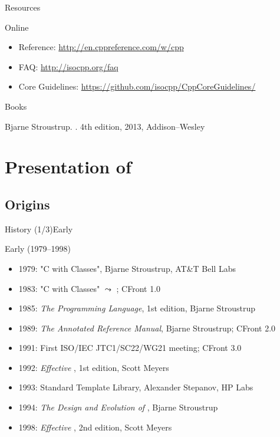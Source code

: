 \begin{frame}{Resources}{}
  \begin{block}{Online}
    \begin{itemize}
    \item
      \CCLang Reference: \url{http://en.cppreference.com/w/cpp}
    \item
      \CCLang FAQ: \url{http://isocpp.org/faq}
    \item
      \CCLang Core Guidelines: \url{https://github.com/isocpp/CppCoreGuidelines/}
    \end{itemize}
  \end{block}

  \begin{block}{Books}
    \begin{thebibliography}{}
      Bjarne Stroustrup.
      .
      \newblock 4th edition, 2013, Addison--Wesley
    \end{thebibliography}
  \end{block}
\end{frame}

\section{Presentation of \CCLang}

\subsection{\CCLang Origins}


\begin{frame}{\CCLang History (1/3)}{Early \CCLang}
  \begin{block}{Early \CCLang (1979--1998)}
    \begin{itemize}
    \item
      1979: "C with Classes", Bjarne Stroustrup, AT\&T Bell Labs
    \item
      1983: "C with Classes" $\leadsto$ \CCLang; CFront 1.0
    \item
      1985: \emph{The \CCLang Programming Language}, 1st edition, Bjarne Stroustrup
    \item
      1989: \emph{The Annotated \CCLang Reference Manual}, Bjarne Stroustrup; CFront 2.0
    \item
      1991: First ISO/IEC JTC1/SC22/WG21 meeting; CFront 3.0
    \item
      1992: \emph{Effective \CCLang}, 1st edition, Scott Meyers
    \item
      1993: Standard Template Library, Alexander Stepanov, HP Labs
    \item
      1994: \emph{The Design and Evolution of \CCLang}, Bjarne Stroustrup
    \item
      1998: \emph{Effective \CCLang}, 2nd edition, Scott Meyers
    \end{itemize}
  \end{block}
\end{frame}

